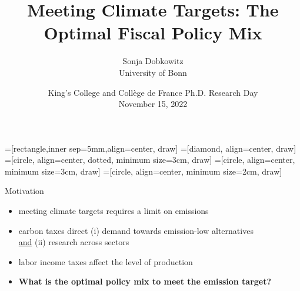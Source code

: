 \documentclass[11pt,aspectratio=169]{beamer}
\author[Sonja Dobkowitz]{\small Sonja Dobkowitz\\ \footnotesize{University of Bonn%
}\\ }
\title{Meeting Climate Targets: The Optimal Fiscal Policy Mix}
\date{\small{King's College and Collège de France Ph.D. Research Day\\ November 15, 2022 }}
\begin{document}
=[rectangle,inner sep=5mm,align=center, draw]
=[diamond, align=center, draw]
=[circle, align=center, dotted, minimum size=3cm, draw]
=[circle, align=center, minimum size=3cm, draw]
=[circle, align=center, minimum size=2cm, draw]
{
	\begin{frame}
		\titlepage
	\end{frame}
}



\addtocounter{framenumber}{-1}
\begin{frame}{Motivation}
	
	\begin{itemize}[<+-| alert@+>]
		\item meeting climate targets requires a limit on emissions \citep{IPCC2022}
		\vspace{3mm}
		\item carbon taxes  direct  (i) demand towards emission-low alternatives\\ \hspace{23mm} \underline{and} (ii) research across sectors
		\vspace{3mm}
		\item labor income taxes affect the level of production 
		\vspace{3mm}
		\item \textbf{What is the optimal policy mix to meet the emission target?}
	\end{itemize}
\end{frame}
\end{document}
